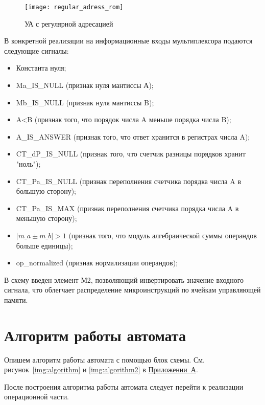 \documentclass[a4paper,14pt]{extarticle}
\begin{document}
\begin{figure}[h!]
	\begin{center}
		\texttt{[image: regular\_adress\_rom]}
		\caption{УА с регулярной адресацией}
		\label{img:scheme}
	\end{center}	
\end{figure}

В конкретной реализации на информационные входы мультиплексора подаются следующие сигналы:
	\hypertarget{name}{}
\begin{itemize}

	\item Константа нуля;
	\item Ma\_IS\_NULL (признак нуля мантиссы А);
	\item Mb\_IS\_NULL (признак нуля мантиссы B);
	\item A<B (признак того, что порядок числа A меньше порядка числа B);
	\item A\_IS\_ANSWER (признак того, что ответ хранится в регистрах числа A);
	\item CT\_dP\_IS\_NULL (признак того, что счетчик разницы порядков хранит "ноль");
	\item CT\_Pa\_IS\_NULL (признак переполнения счетчика порядка числа A в большую сторону);
	\item CT\_Pa\_IS\_MAX  (признак переполнения счетчика порядка числа A в меньшую сторону);
	\item $\left|m\_a\pm m\_b\right|>1$ (признак того, что модуль алгебраической суммы операндов больше единицы);
	\item op\_normalized (признак нормализации операндов);
\end{itemize}

В схему введен элемент М2, позволяющий инвертировать значение входного сигнала, что облегчает распределение микроинструкций по ячейкам управляющей памяти.

\section{Алгоритм работы автомата}
Опишем алгоритм работы автомата с помощью блок схемы. См. рисунок~\ref{img:algorithm} и \ref{img:algorithm2} в \hyperref[tam]{Приложении~А}.

После построения алгоритма работы автомата следует перейти к реализации операционной части.
\end{document}
